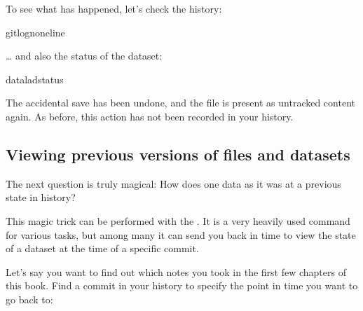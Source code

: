 \sphinxAtStartPar
To see what has happened, let’s check the history:

\begin{sphinxVerbatim}[commandchars=\\\{\}]
gitlog\PYGZhy{}n\PYGZhy{}\PYGZhy{}oneline
\end{sphinxVerbatim}

\sphinxAtStartPar
… and also the status of the dataset:

\begin{sphinxVerbatim}[commandchars=\\\{\}]
dataladstatus
\end{sphinxVerbatim}

\sphinxAtStartPar
The accidental save has been undone, and the file is present
as untracked content again.
As before, this action has not been recorded in your history.


\subsection{Viewing previous versions of files and datasets}
\label{\detokenize{basics/101-137-history:viewing-previous-versions-of-files-and-datasets}}
\sphinxAtStartPar
The next question is truly magical: How does one 
data as it was at a previous state in history?

\sphinxAtStartPar
This magic trick can be performed with the .
It is a very heavily used command for various tasks, but among
many it can send you back in time to view the state of a dataset
at the time of a specific commit.

\sphinxAtStartPar
Let’s say you want to find out which notes you took in the first
few chapters of this book. Find a commit {\hyperref[\detokenize{glossary:term-shasum}]{}} in your history
to specify the point in time you want to go back to:

